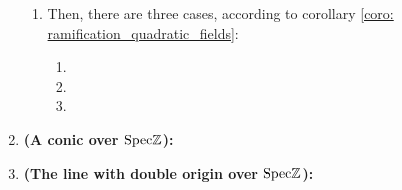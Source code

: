\begin{example}
\begin{enumerate}
\begin{enumerate}
                                    \item Then, there are three cases, according to corollary \ref{coro: ramification_quadratic_fields}:
                                        \begin{enumerate}
                                            \item 
                                            \item
                                            \item
                                        \end{enumerate}
                                \end{enumerate}
                            \item \textbf{(A conic over $\mathrm{Spec} \mathbb{Z}$):}
                            \item \textbf{(The line with double origin over $\mathrm{Spec} \mathbb{Z}$):}
                        \end{enumerate}
                    \end{example}
                    
